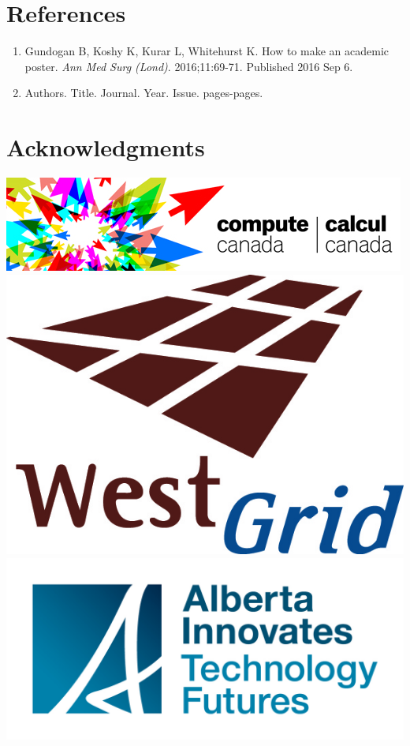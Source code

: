 \documentclass[a0,final,landscape]{a0poster}
\begin{document}
\begin{minipage}[c][-30cm]{0.3\textwidth}
\section*{\textcolor{blue1}{\Large \bf{References}}}
\vspace{-1cm}
\tiny{
\begin{enumerate}
 \item Gundogan B, Koshy K, Kurar L, Whitehurst K. How to make an academic poster. \textit{Ann Med Surg (Lond)}. 2016;11:69-71. Published 2016 Sep 6. 
 \item Authors. Title. Journal. Year. Issue. pages-pages.
\end{enumerate}
}
\vspace{-1.2cm}
\section*{\textcolor{blue1}{\Large \bf{Acknowledgments}}}
\begin{center}
\vspace{-0.5cm}
\includegraphics[scale=0.7]{img/CCanada_logo.png}
\includegraphics[scale=0.18]{img/westgrid_logo.jpg}
\includegraphics[scale=0.7]{img/AB_logo.jpg}
\end{center}

\end{minipage}
\end{document}
